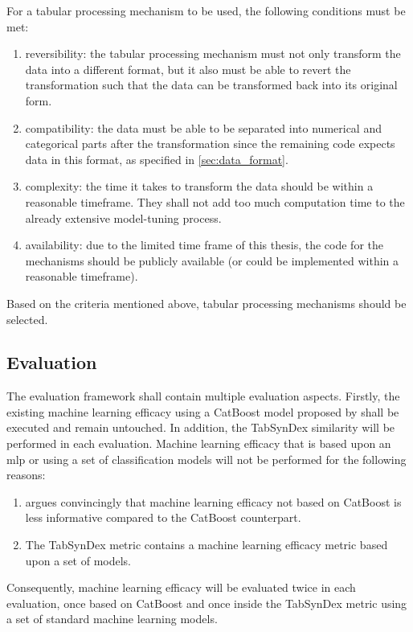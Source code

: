 For a tabular processing mechanism to be used, the following conditions must be met:

\begin{enumerate}
	\item reversibility: the tabular processing mechanism must not only transform the data into a different format, but it also must be able to revert the transformation
	      such that the data can be transformed back into its original form.
	\item compatibility: the data must be able to be separated into numerical and categorical parts after the transformation
	      since the remaining code expects data in this format, as specified in \autoref{sec:data_format}.
	\item complexity: the time it takes to transform the data should be within a reasonable timeframe. They shall not add too much computation time to the already extensive model-tuning process.
	\item availability: due to the limited time frame of this thesis, the code for the mechanisms should be publicly available (or could be implemented within a reasonable timeframe).
\end{enumerate}

Based on the criteria mentioned above, tabular processing mechanisms should be selected.


\subsection[]{Evaluation}
\label{ch:conceptualDesign-Evaluation}
The evaluation framework shall contain multiple evaluation aspects.
Firstly, the existing machine learning efficacy using a CatBoost model proposed by \cite{kotelnikov2022TabDDPMModellingTabular} shall be executed and remain untouched.
In addition, the TabSynDex \cite{chundawat2022UniversalMetricRobust} similarity will be performed in each evaluation.
Machine learning efficacy that is based upon an \gls{mlp} or using a set of classification models will not be performed for the following reasons:
\begin{enumerate}
	\item \cite{kotelnikov2022TabDDPMModellingTabular} argues convincingly that machine learning efficacy not based on CatBoost is less informative compared to the CatBoost counterpart.
	\item The TabSynDex metric contains a machine learning efficacy metric based upon a set of models.
\end{enumerate}
Consequently, machine learning efficacy will be evaluated twice in each evaluation, once based on CatBoost and once inside the TabSynDex metric using a set of standard machine learning models.

